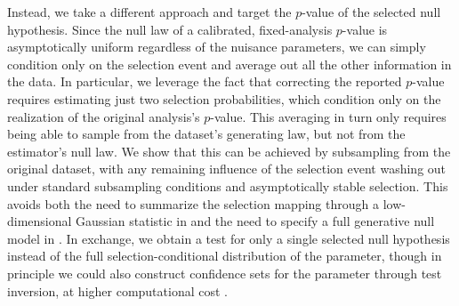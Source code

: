 \documentclass[10pt]{article}
\begin{document}
Instead, we take a different approach and target the $p$-value of the selected null hypothesis. Since the null law of a calibrated, fixed-analysis $p$-value is asymptotically uniform regardless of the nuisance parameters, we can simply condition only on the selection event and average out all the other information in the data. In particular, we leverage the fact that correcting the reported $p$-value requires estimating just two selection probabilities, which condition only on the realization of the original analysis's $p$-value. This averaging in turn only requires being able to sample from the dataset's generating law, but not from the estimator's null law. We  show that this can be achieved by subsampling from the original dataset, with any remaining influence of the selection event washing out under standard subsampling conditions and asymptotically stable selection. This avoids both the need to summarize the selection mapping through a low-dimensional Gaussian statistic in \citet{markovic2019inference, liu2022black} and the need to specify a full generative null model in \citet{liu2025flexible}. In exchange, we  obtain a test for only a single selected null hypothesis instead of the full selection-conditional distribution of the parameter, though in principle we could also construct confidence sets for the parameter through test inversion, at higher computational cost \citep{sood2024selective}.
\end{document}
